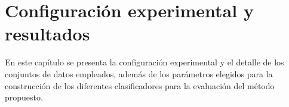 \chapter{Configuración experimental y resultados}
En este capítulo se presenta la configuración experimental y el detalle de los conjuntos de datos empleados, además de los parámetros elegidos para la construcción de los diferentes clasificadores para la evaluación del método propuesto.








